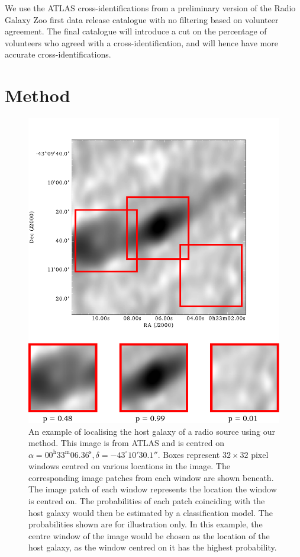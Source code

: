 \documentclass[fleqn,usenatbib,usedcolumn]{mnras}
\begin{document}
    We use the ATLAS cross-identifications from a preliminary version of the
    Radio Galaxy Zoo first data release catalogue with no filtering based on
    volunteer agreement. The final catalogue will introduce a cut on the
    percentage of volunteers who agreed with a cross-identification, and will
    hence have more accurate cross-identifications.

  \section{Method}\label{sec:method}
    \begin{figure}
      \centering
      \includegraphics[width=\columnwidth]{images/elais_0093C1_with_boxes.pdf}
      \caption{An example of localising the host galaxy of a radio source using
        our method. This image is from ATLAS and is centred on $\alpha =
        00^\text{h}33^\text{m}06.36^\text{s}, \delta = -43^\circ{}10'30.1''$.
        Boxes represent $32 \times 32$ pixel windows centred on various
        locations in the image. The corresponding image patches from each
        window are shown beneath. The image patch of each window represents
        the location the window is centred on. The probabilities of each patch
        coinciding with the host galaxy would then be estimated by a
        classification model. The probabilities shown are for illustration
        only. In this example, the centre window of the image would be chosen
        as the location of the host galaxy, as the window centred on it has
        the highest probability.}
      \label{fig:windows}
    \end{figure}
\end{document}
